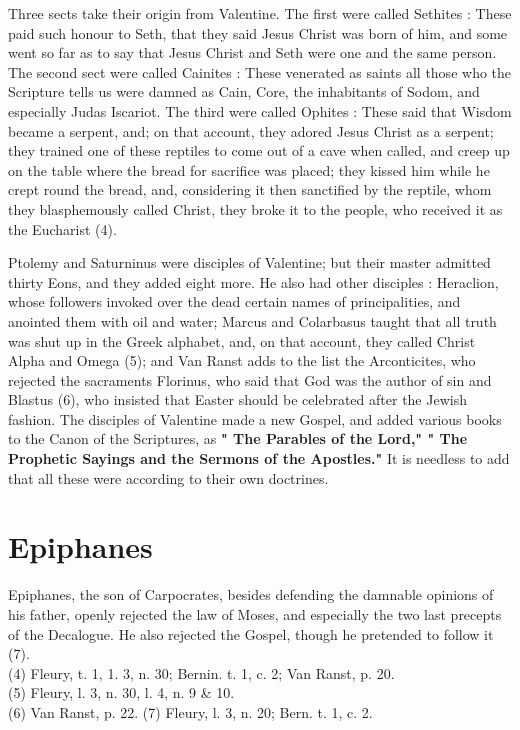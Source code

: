 \documentclass[12pt]{book}
\begin{document}
Three sects take their origin from Valentine. The first were called Sethites : These paid such honour to
Seth, that they said Jesus Christ was born of him, and some went so far as to say that Jesus Christ and
Seth were one and the same person. The second sect were called Cainites : These venerated as saints all
those who the Scripture tells us were damned as Cain, Core, the inhabitants of Sodom, and especially
Judas Iscariot. The third were called Ophites : These said that Wisdom became a serpent, and; on that
account, they adored Jesus Christ as a serpent; they trained one of these reptiles to come out of a cave
when called, and creep up on the table where the bread for sacrifice was placed; they kissed him while he
crept round the bread, and, considering it then sanctified by the reptile, whom they blasphemously called
Christ, they broke it to the people, who received it as the Eucharist (4).

Ptolemy and Saturninus were disciples of Valentine; but their master admitted thirty Eons, and they
added eight more. He also had other disciples : Heraclion, whose followers invoked over the dead certain
names of principalities, and anointed them with oil and water; Marcus and Colarbasus taught that all
truth was shut up in the Greek alphabet, and, on that account, they called Christ Alpha and Omega (5);
and Van Ranst adds to the list the Arconticites, who rejected the sacraments Florinus, who said that God
was the author of sin and Blastus (6), who insisted that Easter should be celebrated after the Jewish
fashion. The disciples of Valentine made a new Gospel, and added various books to the Canon of the
Scriptures, as \textbf{" The Parables of the Lord," " The Prophetic Sayings and the Sermons of the Apostles."} It is
needless to add that all these were according to their own doctrines.
\section{Epiphanes}
Epiphanes, the son of Carpocrates, besides defending the damnable opinions of his father, openly
rejected the law of Moses, and especially the two last precepts of the Decalogue. He also rejected the
Gospel, though he pretended to follow it (7).\\
(4) Fleury, t. 1, 1. 3, n. 30; Bernin. t. 1, c. 2; Van Ranst, p. 20.\\
(5) Fleury, l. 3, n. 30, l. 4, n. 9 \& 10. \\
(6) Van Ranst, p. 22. (7) Fleury, l. 3, n. 20; Bern. t. 1, c. 2.
\end{document}
